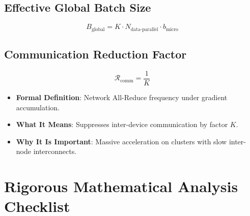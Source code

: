 \documentclass[11pt,a4paper]{article}
\theoremstyle{definition}
\begin{document}
\subsection{Effective Global Batch Size}
{\boldmath
\begin{equation}
B_{\text{global}} = K \cdot N_{\text{data-parallel}} \cdot b_{\text{micro}}
\end{equation}
}

\subsection{Communication Reduction Factor}
{\boldmath
\begin{equation}
\mathcal{R}_{\text{comm}} = \frac{1}{K}
\end{equation}
}
\begin{itemize}
    \item \textbf{Formal Definition}: Network All-Reduce frequency under gradient accumulation.
    \item \textbf{What It Means}: Suppresses inter-device communication by factor $K$.
    \item \textbf{Why It Is Important}: Massive acceleration on clusters with slow inter-node interconnects.
\end{itemize}

\section{Rigorous Mathematical Analysis Checklist}
\end{document}
